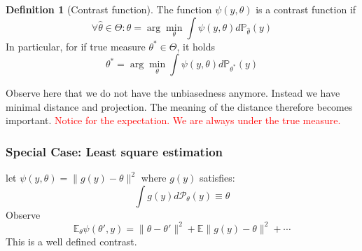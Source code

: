 \documentclass[a4paper,12pt, oneside, fleqn]{book}
\theoremstyle{definition}
\newtheorem{definition}{Definition}[section]
\theoremstyle{remark}
\begin{document}
\begin{definition}[Contrast function]
	The function $\psi(y, \theta)$ is a contrast function if
	\begin{equation*}
		\forall \hat{\theta} \in \Theta: 
		\hat{\theta} = \arg\min_{\theta} \int \psi(y, \theta) d\mathbb{P}_{\hat{\theta}}(y)
	\end{equation*} 
	In particular, for if true measure $\theta^* \in \Theta$, it holds 
	\begin{equation*}
		\theta^* = \arg\min_\theta \int \psi(y, \theta) d\mathbb{P}_{\theta^*}(y)
	\end{equation*}

\end{definition}
Observe here that we do not have the unbiasedness anymore. Instead we have minimal distance and projection. The meaning of the distance therefore becomes important. \textcolor{red}{Notice for the expectation. We are always under the true measure.} \par 

\subsubsection*{Special Case: Least square estimation}
let $\psi(y, \theta) = \| g(y) - \theta \|^2$ where $g(y)$ satisfies:
\begin{equation*}
	\int g(y) d\mathcal{P}_\theta(y) \equiv \theta
\end{equation*}
Observe
\begin{equation*}
	\mathbb{E}_\theta \psi(\theta', y) = \| \theta - \theta' \|^2 + \mathbb{E}\|g(y) - \theta\|^2 + \cdots
\end{equation*}
This is a well defined contrast.
\end{document}
